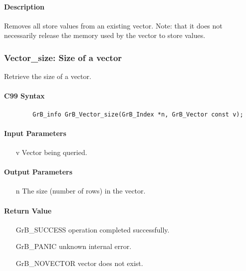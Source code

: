 \paragraph{Description}

Removes all store values from an existing vector.  Note: that it does not
necessarily release the memory used by the vector to store values.

\subsubsection{{\sf Vector\_size}: Size of a vector}

Retrieve the size of a vector.

\paragraph{C99 Syntax}

\begin{verbatim}
        GrB_info GrB_Vector_size(GrB_Index *n, GrB_Vector const v);
\end{verbatim}

\paragraph{Input Parameters}

\begin{itemize}[leftmargin=1.1in]
    \item[{\sf v}] Vector being queried.
\end{itemize}

\paragraph{Output Parameters}
\begin{itemize}[leftmargin=1.1in]
    \item[{\sf n}] The size (number of rows) in the vector.
\end{itemize}

\paragraph{Return Value}

\begin{itemize}[leftmargin=2.1in]
\item[{\sf GrB\_SUCCESS}]   operation completed successfully.
\item[{\sf GrB\_PANIC}]     unknown internal error.
\item[{\sf GrB\_NOVECTOR}]  vector does not exist.
\end{itemize}

